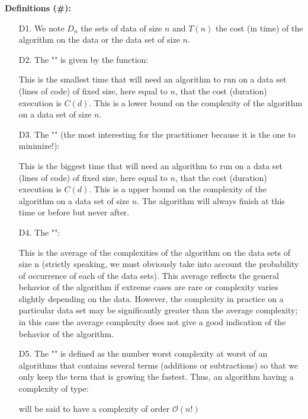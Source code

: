 \textbf{Definitions (\#\mydef):}
	\begin{enumerate}
		\item[D1.] We note $D_n$ the sets of data of size $n$ and $T(n)$ the cost (in time) of the algorithm on the data or the data set of size $n$.
		\item[D2.] The "" is given by the function:
			
		This is the smallest time that will need an algorithm to run on a data set (lines of code) of fixed size, here equal to $n$, that the cost (duration) execution is $C(d)$. This is a lower bound on the complexity of the algorithm on a data set of size $n$.
		\item[D3.] The "" (the most interesting for the practitioner because it is the one to minimize!):
			
		This is the biggest time that will need an algorithm to run on a data set (lines of code) of fixed size, here equal to $n$, that the cost (duration) execution is $C(d)$. This is a upper bound on the complexity of the algorithm on a data set of size $n$. The algorithm will always finish at this time or before but never after.
		\item[D4.] The "":
			
This is the average of the complexities of the algorithm on the data sets of size n (strictly speaking, we must obviously take into account the probability of occurrence of each of the data sets). This average reflects the general behavior of the algorithm if extreme cases are rare or complexity varies slightly depending on the data. However, the complexity in practice on a particular data set may be significantly greater than the average complexity; in this case the average complexity does not give a good indication of the behavior of the algorithm.		
		\item[D5.] The "" is defined as the number worst complexity at worst of an algorithms that contains several terms (additions or subtractions) so that we only keep the term that is growing the fastest. Thus, an algorithm having a complexity of type:
			
will be said to have a complexity of order $\mathcal{O}(n!)$
	\end{enumerate}

